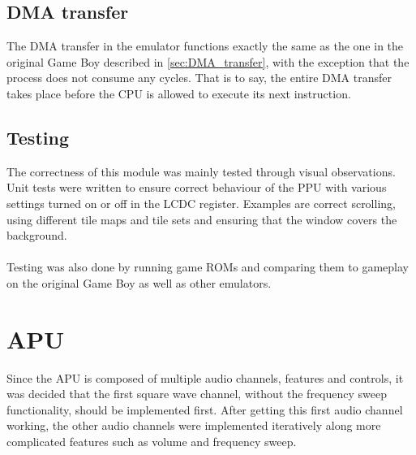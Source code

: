 \subsection{DMA transfer}
\label{sec:DMA_transfer_result}
The DMA transfer in the emulator functions exactly the same as the one in the original Game Boy described in \ref{sec:DMA_transfer}, with the exception that the process does not consume any cycles. That is to say, the entire DMA transfer takes place before the CPU is allowed to execute its next instruction.

\subsection{Testing}
The correctness of this module was mainly tested through visual observations. Unit tests were written to ensure correct behaviour of the PPU with various settings turned on or off in the LCDC register. Examples are correct scrolling, using different tile maps and tile sets and ensuring that the window covers the background.\\
\\
Testing was also done by running game ROMs and comparing them to gameplay on the original Game Boy as well as other emulators.

\section{APU}

Since the APU is composed of multiple audio channels, features and controls, it was decided that the first square wave channel, without the frequency sweep functionality, should be implemented first. After getting this first audio channel working, the other audio channels were implemented iteratively along more complicated features such as volume and frequency sweep.

